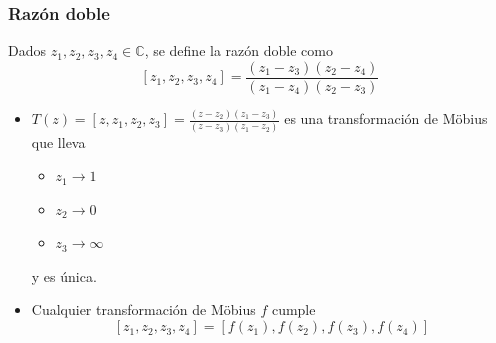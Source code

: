 \documentclass[paper=a4, fontsize=11pt]{scrartcl}
\numberwithin{equation}{section}
\numberwithin{figure}{section}
\numberwithin{table}{section}
\begin{document}
\subsubsection{Razón doble}
Dados $z_1,z_2,z_3,z_4\in\mathbb{C}$, se define la razón doble como
$$[z_1,z_2,z_3,z_4] = \frac{(z_1-z_3)(z_2-z_4)}{(z_1-z_4)(z_2-z_3)}$$

\begin{itemize}
\item $T(z) = [z,z_1,z_2,z_3] = \frac{(z-z_2)(z_1-z_3)}{(z-z_3)(z_1-z_2)}$ es una transformación de Möbius que lleva
\begin{itemize}
\item $z_1\to1$
\item $z_2\to0$
\item $z_3\to\infty$
\end{itemize}
y es única.
\item Cualquier transformación de Möbius $f$ cumple
$$[z_1,z_2,z_3,z_4] = \left[f(z_1),f(z_2),f(z_3),f(z_4)\right]$$
\end{itemize}
\end{document}
